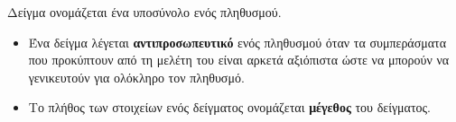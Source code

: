Δείγμα ονομάζεται ένα υποσύνολο ενός πληθυσμού. \begin{itemize}
\item Ένα δείγμα λέγεται \textbf{αντιπροσωπευτικό} ενός πληθυσμού όταν τα συμπεράσματα που προκύπτουν από τη μελέτη του είναι αρκετά αξιόπιστα ώστε να μπορούν να γενικευτούν για ολόκληρο τον πληθυσμό.
\item Το πλήθος των στοιχείων ενός δείγματος ονομάζεται \textbf{μέγεθος} του δείγματος.
\end{itemize}
